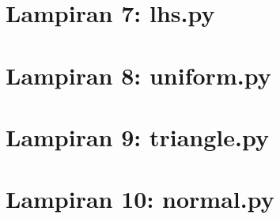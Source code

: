 \begin{landscape}
\chapter*{Lampiran 7: lhs.py}
\scriptsize

\normalsize

\chapter*{Lampiran 8: uniform.py}
\scriptsize

\normalsize

\chapter*{Lampiran 9: triangle.py}
\scriptsize

\normalsize

\chapter*{Lampiran 10: normal.py}
\scriptsize

\normalsize
\end{landscape}
